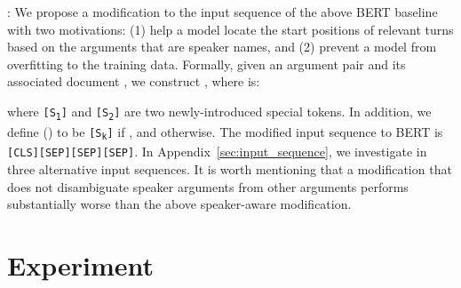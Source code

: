 \documentclass[11pt,a4paper]{article}
\begin{document}
\medskip

\noindent \textbf{}:  We propose a modification to the input sequence of the above BERT baseline with two motivations: (1) help a model locate the start positions of relevant turns based on the arguments that are speaker names, and (2) prevent a model from overfitting to the training data. Formally, given an argument pair  and its associated document , we construct  , where  is:




where \texttt{[S\textsubscript{1}]} and \texttt{[S\textsubscript{2}]} are two newly-introduced special tokens. In addition, we define  () to be \texttt{[S\textsubscript{k}]} if , and  otherwise. The modified input sequence to BERT is \texttt{[CLS]}\texttt{[SEP]}\texttt{[SEP]}\texttt{[SEP]}. In Appendix~\ref{sec:input_sequence}, we investigate in three alternative input sequences. It is worth mentioning that a modification that does not disambiguate speaker arguments from other arguments performs substantially worse than the above speaker-aware modification.











 \section{Experiment}
\label{sec:experiment}
\end{document}
